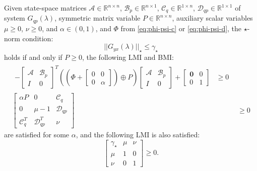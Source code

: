 \begin{thm} \label{thm:l1}
	Given state-space matrices $\mathcal{A} \in \mathbb{R}^{n \times n}$, $\mathcal{B}_p \in \mathbb{R}^{n \times 1}$, $\mathcal{C}_q \in \mathbb{R}^{1 \times n}$, $\mathcal{D}_{qp} \in \mathbb{R}^{1 \times 1}$ of system $G_{qp}(\lambda)$, symmetric matrix variable $P \in \mathbb{R}^{n \times n}$, auxiliary scalar variables $\mu \geq 0$, $\nu \geq 0$, and $\alpha \in (0, 1)$, and $\Phi$ from \autoref{eq:phi-psi-c} or \ref{eq:phi-psi-d}, the $\star$-norm condition:
	\begin{equation*}
		||G_{yx}(\lambda)||_\star \leq \gamma_\star
	\end{equation*}
	holds if and only if $P \geq 0$, the following \gls{LMI} and \gls{BMI}:
	\begin{align}
		\begin{split}
			-\begin{bmatrix}
				\mathcal{A} & \mathcal{B}_p \\
				I & 0
			\end{bmatrix}^T
			\left(\left(\Phi + 
			\begin{bmatrix}
				0 & 0 \\
				0 & \alpha
			\end{bmatrix}\right) \oplus P\right)
			\begin{bmatrix}
				\mathcal{A} & \mathcal{B}_p \\
				I & 0
			\end{bmatrix} +
			\begin{bmatrix}
				\mathbf{0} & 0 \\
				0 & 1
			\end{bmatrix} &\geq 0 \label{eq:lmi1-1}
		\end{split} \\
		\begin{bmatrix}
			\alpha P & 0 & \mathcal{C}_q \\
			0 & \mu - 1 & \mathcal{D}_{qp} \\
			\mathcal{C}_q^T & \mathcal{D}_{qp}^T & \nu
		\end{bmatrix} &\geq 0 \label{eq:lmi1-2}
	\end{align}
	are satisfied for some $\alpha$, and the following \gls{LMI} is also satisfied:
	\begin{equation}
		\begin{bmatrix}
			\gamma_\star & \mu & \nu \\
			\mu & 1 & 0 \\
			\nu & 0 & 1
		\end{bmatrix} \geq 0 \label{eq:lmi1-3}.
	\end{equation}
\end{thm}

